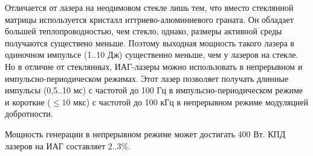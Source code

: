 Отличается от лазера на неодимовом стекле лишь тем, что вместо стеклянной 
матрицы используется кристалл иттриево-алюминиевого граната. Он обладает 
большей теплопроводностью, чем стекло, однако, размеры активной среды 
получаются существено меньше. Поэтому выходная мощность такого лазера в 
одиночном импульсе (1..10 Дж) существенно меньше, чем у лазеров на стекле. 
Но в отличие от стеклянных, ИАГ-лазеры можно использовать в непрерывном и 
импульсно-периодическом режимах. Этот лазер позволяет получать длинные 
импульсы (0,5..10 мс) с частотой до 100 Гц в импульсно-периодическом режиме и 
короткие (\(\le 10\) мкс) с частотой до 100 кГц в непрерывном режиме 
модуляцией добротности.

Мощность генерации в непрерывном режиме может достигать 400 Вт. КПД лазеров на 
ИАГ составляет 2..3\%.